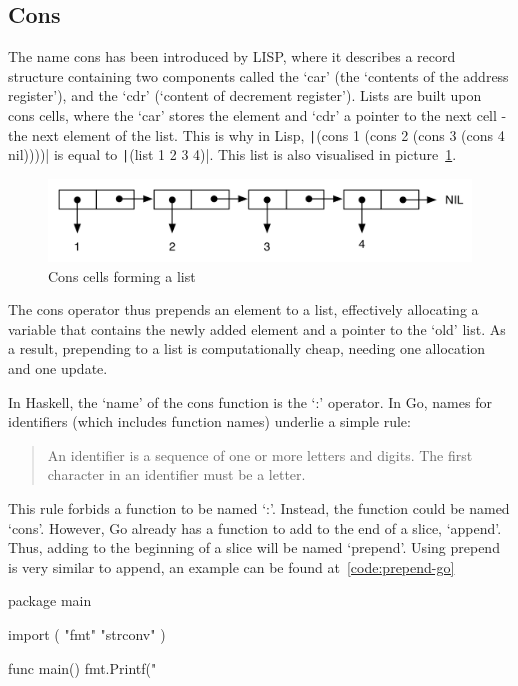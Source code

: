 \subsection{Cons}

The name cons has been introduced by LISP, where it describes a record structure
containing two components called the `car' (the `contents of the address register'),
and the `cdr' (`content of decrement register').
Lists are built upon cons cells, where the `car' stores the element and `cdr' a
pointer to the next cell - the next element of the list.
This is why in Lisp, \texttt|(cons 1 (cons 2 (cons 3 (cons 4 nil))))| is equal to
\texttt|(list 1 2 3 4)|. This list is also visualised in picture~\ref{fig:cons}.

\begin{figure}[h!]
  \includegraphics[width=\linewidth]{../img/cons.png}
  \caption{Cons cells forming a list\autocite{cons-image-source}}
  \label{fig:cons}
\end{figure}

The cons operator thus prepends an element to a list, effectively allocating a
variable that contains the newly added element and a pointer to the `old' list.
As a result, prepending to a list is computationally cheap, needing one allocation
and one update.

In Haskell, the `name' of the cons function is the `:' operator.
In Go, names for identifiers (which includes function names) underlie a simple
rule:
\begin{quote}
    An identifier is a sequence of one or more letters and digits. The first
    character in an identifier must be a letter.\autocite{spec-identifiers}
\end{quote}

This rule forbids a function to be named `:'. Instead, the function could be
named `cons'. However, Go already has a function to add to the end of a slice,
`append'. Thus, adding to the beginning of a slice will be named `prepend'.
Using prepend is very similar to append, an example can be found at~\ref{code:prepend-go}

\begin{code}
    \label{code:prepend-go}
    \begin{gocode}
package main

import (
        "fmt"
        "strconv"
)

func main() {
        fmt.Printf("%
}
\end{gocode}
\end{code}

